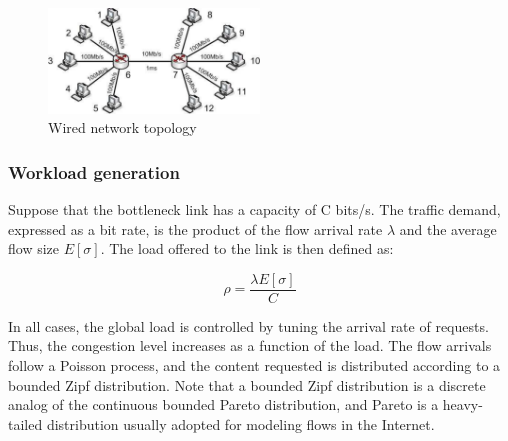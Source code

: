 \documentclass[preprint,12pt]{elsarticle}
\begin{document}
\begin{figure}[ht!]
  \centering
  \includegraphics[width=0.5\textwidth]{./fig/wired/topology/topology}
  \caption{Wired network topology}
  \label{fig:wired_topology}
\end{figure}



\subsubsection{Workload generation}\label{sec:workload}
Suppose that the bottleneck link has a capacity of C bits/s. The traffic demand, expressed as a bit rate, is the product of the flow arrival rate $\lambda$ and the average flow size $E[\sigma]$. The load offered to the link is then defined as:

\begin{equation}
\rho = \frac{\lambda E[\sigma]}{C}
\end{equation}

In all cases, the global load is controlled by tuning the arrival rate of requests. Thus, the congestion level increases as a function of the load. The flow arrivals follow a Poisson process, and the content requested is distributed according to a bounded Zipf distribution. Note that a bounded Zipf distribution is a discrete analog of the continuous bounded Pareto distribution, and Pareto is a heavy-tailed distribution usually adopted for modeling flows in the Internet. %
 
\end{document}

